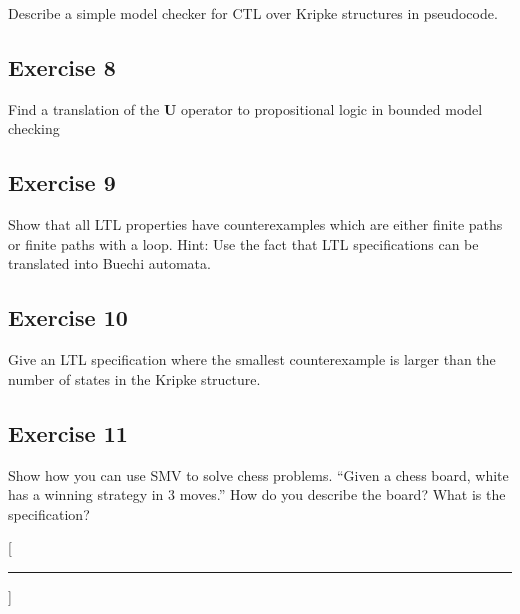 \documentclass[a4paper, 12pt]{article}
\begin{document}
Describe a simple model checker for CTL over Kripke structures in pseudocode.

\subsection{Exercise 8}

Find a translation of the $\mathbf{U}$ operator to propositional logic in
bounded model checking

\subsection{Exercise 9}

Show that all LTL properties have counterexamples which are either finite
paths or finite paths with a loop. Hint: Use the fact that LTL specifications
can be translated into Buechi automata.

\subsection{Exercise 10}

Give an LTL specification where the smallest counterexample is larger than the
number of states in the Kripke structure.

\subsection{Exercise 11}

Show how you can use SMV to solve chess problems. “Given a chess board, white
has a winning strategy in 3 moves.” How do you describe the board? What is
the specification?


\titleformat{\section}{\sffamily\bfseries}{}{0pt}{}[{\color{aqua}\hrule}]
\printbibliography
\end{document}
